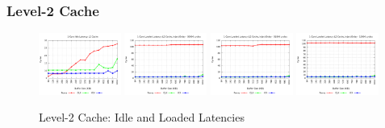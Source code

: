 \documentclass{article}
\begin{document}
\subsubsection{Level-2 Cache}
\begin{figure}[!ht]
    \centering
    \includegraphics[width=0.24\textwidth]{../data/mlc/il_l2}
    \includegraphics[width=0.24\textwidth]{../data/mlc/ll_l2_00000}
    \includegraphics[width=0.24\textwidth]{../data/mlc/ll_l2_01000}
    \includegraphics[width=0.24\textwidth]{../data/mlc/ll_l2_10000}
    \caption{Level-2 Cache: Idle and Loaded Latencies}
    \label{figure:mlc_lat_l2}
\end{figure}
\end{document}
